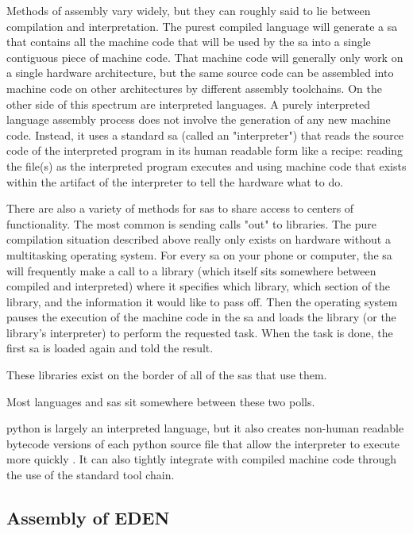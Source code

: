 \documentclass[a4paper,man,natbib]{apa6}
\begin{document}
   Methods of assembly vary widely, but they can roughly said to lie between compilation and interpretation. The purest compiled language will generate a \gls{sa} that contains all the machine code that will be used by the \gls{sa} into a single contiguous piece of machine code. That machine code will generally only work on a single hardware architecture, but the same source code can be assembled into machine code on other architectures by different assembly toolchains. On the other side of this spectrum are interpreted languages. A purely interpreted language assembly process does not involve the generation of any new machine code. Instead, it uses a standard \gls{sa} (called an "interpreter") that reads the source code of the interpreted program in its human readable form like a recipe: reading the file(s) as the interpreted program executes and using machine code that exists within the artifact of the interpreter to tell the hardware what to do.

   There are also a variety of methods for \glspl{sa} to share access to centers of functionality. The most common is sending calls "out" to libraries. The pure compilation situation described above really only exists on hardware without a multitasking operating system. For every \gls{sa} on your phone or computer, the \gls{sa} will frequently make a call to a library (which itself sits somewhere between compiled and interpreted) where it specifies which library, which section of the library, and the information it would like to pass off. Then the operating system pauses the execution of the machine code in the \gls{sa} and loads the library (or the library's interpreter) to perform the requested task. When the task is done, the first \gls{sa} is loaded again and told the result. 

   These libraries exist on the border of all of the \glspl{sa} that use them. 

   Most languages and \glspl{sa} sit somewhere between these two polls. 

   \Gls{python} is largely an interpreted language, but it also creates non-human readable bytecode versions of each python source file that allow the interpreter to execute more quickly \citep{The_Python_Software_Foundation2020-qz}. It can also tightly integrate with compiled machine code through the use of the standard tool chain.

   \subsection*{Assembly of EDEN}


   

   
  
   \printnoidxglossaries
   \setlength{\parindent}{4em}
   
\end{document}
